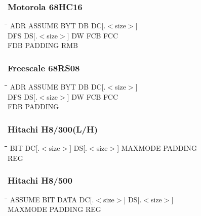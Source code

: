 \subsubsection{Motorola 68HC16}
{\tt\begin{tabbing}
\hspace{3cm}\=\hspace{3cm}\=\hspace{3cm}\=\hspace{3cm}\=\kill
ADR        \> ASSUME      \> BYT         \> DB          \> DC[.$<$size$>$] \\
DFS        \> DS[.$<$size$>$] \> DW      \> FCB         \> FCC \\
FDB         \> PADDING    \> RMB \\
\end{tabbing}}

\subsubsection{Freescale 68RS08}
{\tt\begin{tabbing}
\hspace{3cm}\=\hspace{3cm}\=\hspace{3cm}\=\hspace{3cm}\=\kill
ADR        \> ASSUME      \> BYT         \> DB          \> DC[.$<$size$>$] \\
DFS        \> DS[.$<$size$>$] \> DW      \> FCB         \> FCC \\
FDB         \> PADDING \\
\end{tabbing}}

\subsubsection{Hitachi H8/300(L/H)}
{\tt\begin{tabbing}
\hspace{3cm}\=\hspace{3cm}\=\hspace{3cm}\=\hspace{3cm}\=\kill
BIT    \> DC[.$<$size$>$] \> DS[.$<$size$>$] \> MAXMODE     \> PADDING \\
REG    \\
\end{tabbing}}

\subsubsection{Hitachi H8/500}
{\tt\begin{tabbing}
\hspace{3cm}\=\hspace{3cm}\=\hspace{3cm}\=\hspace{3cm}\=\kill
ASSUME          \> BIT    \> DATA   \> DC[.$<$size$>$] \> DS[.$<$size$>$] \\
MAXMODE         \> PADDING         \> REG \\
\end{tabbing}}

